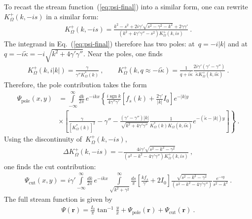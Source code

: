 \documentclass[preprint,aps,eqsecnum, prb]{revtex4-1}
\newcommand{\fplus}[1]{{#1}^{+}}
\newcommand{\sgn}{\mathop{\mathrm{sgn}}\nolimits}
\begin{document}
To recast the stream function~(\ref{eq:psi-final}) into a similar form,
one can rewrite~$\fplus{K}_\Omega(k, -is)$ in a similar form:
\begin{align}
  \fplus{K}_\Omega(k, -is) = \frac{k^2 - s^2 + 2i\gamma' \sqrt{s^2 - \gamma^2 - k^2} + 2\gamma\gamma'}{(k^2 + 4\gamma' \gamma'' - s^2) \fplus{K}_\Omega(k, is)}
  \ . 
\end{align}
The integrand in Eq.~(\ref{eq:psi-final}) therefore has two poles:
at~$q = -i|k|$ and at~$q = -i \tilde{\kappa}
=   -i \sqrt{k^2 + 4\gamma'\gamma''}$.
Near the poles, one finds
\begin{align}
   \label{eq:Komega-pole}
  \fplus{K}_\Omega(k, i|k|) = \frac{\gamma}{\gamma'' K_\Omega^\ast(k)}
  \ ,
  \qquad
  \fplus{K}_{\Omega}(k, q \approx -i \tilde{\kappa})
  = \frac{1}{q + i \tilde{\kappa}} \frac{2i \gamma' (\gamma' - \gamma'')}{
       {\tilde \kappa} \fplus{K}_\Omega(k, i\tilde{\kappa})
  }
  \ . 
\end{align}
Therefore, the pole contribution takes the form
\begin{align}
  \Psi_\mathrm{pole}(x, y) &= \int\limits_{-\infty}^{\infty}
  \frac{dk}{2\pi}\, e^{-ikx} \left\{ 
  \frac{i \sgn k}{4\gamma'' \gamma'}
  \left[f_s(k) + \frac{2\gamma'}{|k|} I_0 \right]
  e^{-|k|y} \right. \\ \nonumber
  &\times \left.
       \left[
         \frac{\gamma}{\left[K_\Omega^\ast(k)\right]^2}
        - \gamma''
       - \frac{(\gamma' - \gamma'') |k|}{\sqrt{k^2 + 4\gamma'\gamma''}}
             \frac{1}{K_\Omega^\ast(k) K_\Omega(k, i\tilde{\kappa})}
             e^{-(\tilde{\kappa}-|k|)y}
  \right]
  \right\} \ . 
\end{align}
Using the discontinuity of~$\fplus{K}_\Omega(k, -is)$,
\begin{align}
   \label{eq:Komega-discont}
  \Delta \fplus{K}_\Omega(k, -is)
  = -\frac{4i\gamma' \sqrt{s^2 - k^2 - \gamma^2}}{
     (s^2 - k^2 - 4 \gamma' \gamma'') \fplus{K}_\Omega(k, is)
  }\ , 
\end{align}
one finds the cut contribution:
\begin{align}
  \Psi_\mathrm{cut}(x, y) = i \gamma'
  \int\limits_{-\infty}^{\infty} \frac{dk}{2\pi}\, e^{-ikx}
  \int\limits_{\sqrt{k^2 + \gamma^2}}^{\infty} \frac{ds}{\pi}
  \left[\frac{k f_s}{\gamma'} + 2 I_0\right]
  \frac{\sqrt{s^2 - k^2 - \gamma^2}}{(s^2 - k^2 - 4\gamma'\gamma'')}
  \frac{e^{-sy}}{s^2 - k^2}\ . 
\end{align}
The full stream function is given by
\begin{align}
  \Psi({\bm r}) = \frac{I_0}{\pi} \tan^{-1}\frac{y}{x}
  + \Psi_\mathrm{pole}({\bm r}) + \Psi_\mathrm{cut}({\bm r})\ . 
\end{align}
\end{document}
